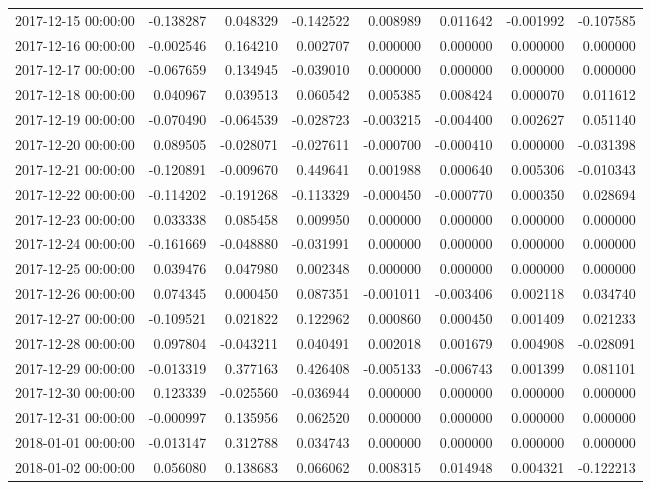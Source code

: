 \begin{tabular}{lrrrrrrr}
2017-12-15 00:00:00 & -0.138287 & 0.048329 & -0.142522 & 0.008989 & 0.011642 & -0.001992 & -0.107585 \\
2017-12-16 00:00:00 & -0.002546 & 0.164210 & 0.002707 & 0.000000 & 0.000000 & 0.000000 & 0.000000 \\
2017-12-17 00:00:00 & -0.067659 & 0.134945 & -0.039010 & 0.000000 & 0.000000 & 0.000000 & 0.000000 \\
2017-12-18 00:00:00 & 0.040967 & 0.039513 & 0.060542 & 0.005385 & 0.008424 & 0.000070 & 0.011612 \\
2017-12-19 00:00:00 & -0.070490 & -0.064539 & -0.028723 & -0.003215 & -0.004400 & 0.002627 & 0.051140 \\
2017-12-20 00:00:00 & 0.089505 & -0.028071 & -0.027611 & -0.000700 & -0.000410 & 0.000000 & -0.031398 \\
2017-12-21 00:00:00 & -0.120891 & -0.009670 & 0.449641 & 0.001988 & 0.000640 & 0.005306 & -0.010343 \\
2017-12-22 00:00:00 & -0.114202 & -0.191268 & -0.113329 & -0.000450 & -0.000770 & 0.000350 & 0.028694 \\
2017-12-23 00:00:00 & 0.033338 & 0.085458 & 0.009950 & 0.000000 & 0.000000 & 0.000000 & 0.000000 \\
2017-12-24 00:00:00 & -0.161669 & -0.048880 & -0.031991 & 0.000000 & 0.000000 & 0.000000 & 0.000000 \\
2017-12-25 00:00:00 & 0.039476 & 0.047980 & 0.002348 & 0.000000 & 0.000000 & 0.000000 & 0.000000 \\
2017-12-26 00:00:00 & 0.074345 & 0.000450 & 0.087351 & -0.001011 & -0.003406 & 0.002118 & 0.034740 \\
2017-12-27 00:00:00 & -0.109521 & 0.021822 & 0.122962 & 0.000860 & 0.000450 & 0.001409 & 0.021233 \\
2017-12-28 00:00:00 & 0.097804 & -0.043211 & 0.040491 & 0.002018 & 0.001679 & 0.004908 & -0.028091 \\
2017-12-29 00:00:00 & -0.013319 & 0.377163 & 0.426408 & -0.005133 & -0.006743 & 0.001399 & 0.081101 \\
2017-12-30 00:00:00 & 0.123339 & -0.025560 & -0.036944 & 0.000000 & 0.000000 & 0.000000 & 0.000000 \\
2017-12-31 00:00:00 & -0.000997 & 0.135956 & 0.062520 & 0.000000 & 0.000000 & 0.000000 & 0.000000 \\
2018-01-01 00:00:00 & -0.013147 & 0.312788 & 0.034743 & 0.000000 & 0.000000 & 0.000000 & 0.000000 \\
2018-01-02 00:00:00 & 0.056080 & 0.138683 & 0.066062 & 0.008315 & 0.014948 & 0.004321 & -0.122213 \\

\end{tabular}

